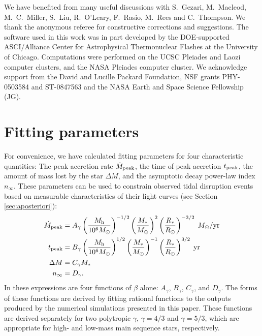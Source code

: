 \documentclass[twocolumn]{emulateapj}
\newcommand{\mdpeak}{\dot{M}_{\rm peak}}
\newcommand{\tpeak}{t_{\rm peak}}
\newcommand{\ms}{M_{\ast}}
\newcommand{\rs}{R_{\ast}}
\newcommand{\mh}{M_{\rm h}}
\newcommand{\msun}{M_{\odot}}
\newcommand{\ninf}{n_{\infty}}
\begin{document}
\acknowledgments We have benefited from many useful discussions with S.~Gezari, M.~Macleod, M.~C.~Miller, S.~Liu, R.~O'Leary, F.~Rasio, M.~Rees and C.~Thompson. We thank the anonymous referee for constructive corrections and suggestions. The software used in this work was in part developed by the DOE-supported ASCI/Alliance Center for Astrophysical Thermonuclear Flashes at the University of Chicago. Computations were performed on the UCSC Pleiades and Laozi computer clusters, and the NASA Pleiades computer cluster. We acknowledge support from the David and Lucille Packard Foundation, NSF grants PHY-0503584 and ST-0847563  and the NASA Earth and Space Science Fellowship (JG).

\appendix
\section{Fitting parameters}\label{sec:appendix}
For convenience, we have calculated fitting parameters for four characteristic quantities: The peak accretion rate $\mdpeak$, the time of peak accretion $\tpeak$, the amount of mass lost by the star $\Delta M$, and the asymptotic decay power-law index $\ninf$. These parameters can be used to constrain observed tidal disruption events based on measurable characteristics of their light curves (see Section \ref{sec:aposteriori}):
\begin{align}
\mdpeak &= A_{\gamma}\left(\frac{\mh}{10^{6} \msun}\right)^{-1/2} \left(\frac{\ms}{\msun}\right)^{2} \left(\frac{\rs}{R_{\odot}}\right)^{-3/2} \;\msun/{\rm yr}\label{eq:mdotpeak}\\
\tpeak &= B_{\gamma}\left(\frac{\mh}{10^{6} \msun}\right)^{1/2} \left(\frac{\ms}{\msun}\right)^{-1} \left(\frac{\rs}{R_{\odot}}\right)^{3/2} \;{\rm yr}\label{eq:tpeak}\\
\Delta M &= C_{\gamma} \ms\\
\ninf &= D_{\gamma}.
\end{align}
In these expressions are four functions of $\beta$ alone: $A_{\gamma}$, $B_{\gamma}$, $C_{\gamma}$, and $D_{\gamma}$. The forms of these functions are derived by fitting rational functions to the outputs produced by the numerical simulations presented in this paper. These functions are derived separately for two polytropic $\gamma$, $\gamma = 4/3$ and $\gamma = 5/3$, which are appropriate for high- and low-mass main sequence stars, respectively.
\end{document}
